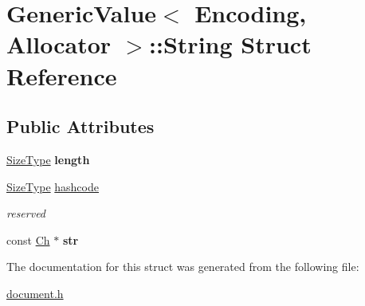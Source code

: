 \hypertarget{a02088}{}\section{Generic\+Value$<$ Encoding, Allocator $>$\+:\+:String Struct Reference}
\label{a02088}
\subsection*{Public Attributes}
\begin{DoxyCompactItemize}
\item 
\mbox{\label{a02088_ad6ffab0e093aa8db6e415812ff6443bf}} 
\hyperlink{a00560_a5ed6e6e67250fadbd041127e6386dcb5}{Size\+Type} {\bfseries length}
\item 
\mbox{\label{a02088_a73631052aeb72fbabb6eaab0175f858e}} 
\hyperlink{a00560_a5ed6e6e67250fadbd041127e6386dcb5}{Size\+Type} \hyperlink{a02088_a73631052aeb72fbabb6eaab0175f858e}{hashcode}
\begin{DoxyCompactList}\small\item\em reserved \end{DoxyCompactList}\item 
\mbox{\label{a02088_a4eebc5acf3f93ab833efd82abf3ba84d}} 
const \hyperlink{a01992_ade0e0ce64ccd5d852da57a35e720bafb}{Ch} $\ast$ {\bfseries str}
\end{DoxyCompactItemize}


The documentation for this struct was generated from the following file\+:\begin{DoxyCompactItemize}
\item 
\hyperlink{a00476}{document.\+h}\end{DoxyCompactItemize}
